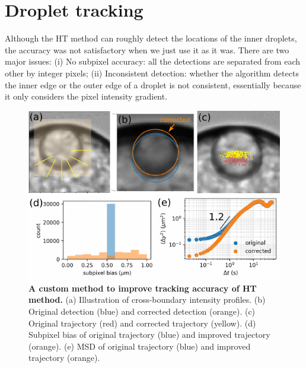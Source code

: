 \documentclass[%
10pt,
superscriptaddress,
twocolumn,
 amsmath,amssymb,
 aps,prx,
]{revtex4-2}
\begin{document}







\appendix

\section{Droplet tracking}

Although the HT method can roughly detect the locations of the inner droplets, the accuracy was not satisfactory when we just use it as it was. 
There are two major issues: 
(i) No subpixel accuracy: all the detections are separated from each other by integer pixels; (ii) Inconsistent detection: whether the algorithm detects the inner edge or the outer edge of a droplet is not consistent, essentially because it only considers the pixel intensity gradient.

\begin{figure}[!t]
  \includegraphics[width=\columnwidth]{hc-correction}
  \caption{
  \textbf{A custom method to improve tracking accuracy of HT method.}
  (a) Illustration of cross-boundary intensity profiles.
  (b) Original detection (blue) and corrected detection (orange).
  (c) Original trajectory (red) and corrected trajectory (yellow).
  (d) Subpixel bias of original trajectory (blue) and improved trajectory (orange).
  (e) MSD of original trajectory (blue) and improved trajectory (orange).
  }
  \label{fig:hc-correction}
\end{figure}
\end{document}
